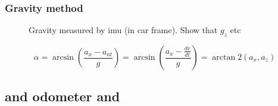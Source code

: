 \subsubsection{Gravity method}
\begin{figure}[htpb]
    \centering
    
    \caption{Gravity measured by \gls{imu} (in car frame). Show that $g_z$ etc}
    \label{fig:tikz_car_gravity}
\end{figure}
\begin{equation}
    \alpha =\arcsin\left(\frac{a_x-a_{at}}{g}\right)=\arcsin\left(\frac{a_x-\frac{dv}{dt}}{g}\right) = \arctan2(a_x,a_z)
    \end{equation}


\subsection{ and odometer and }

